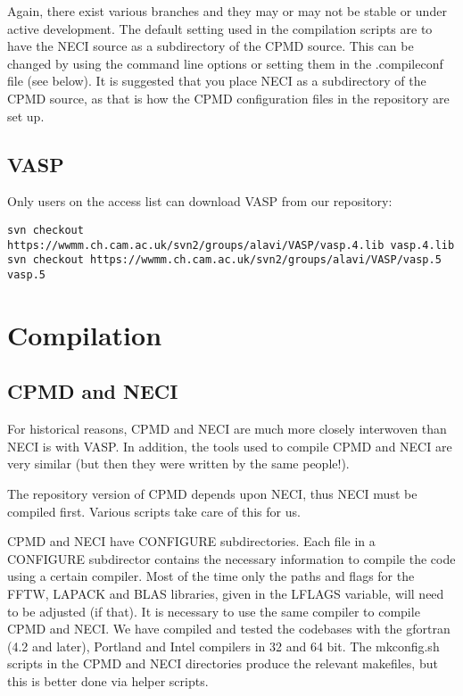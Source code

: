 \documentclass[openany,a4paper,10pt]{manual}
\begin{document}
Again, there exist various branches and they may or may not be stable
or under active development.
The default setting used in the compilation scripts are to have the NECI source as
a subdirectory of the CPMD source.  This can be changed by using the
command line options or setting them in the .compileconf file (see below).
It is suggested that you place NECI as a subdirectory of the CPMD source,
as that is how the CPMD configuration files in the repository are set up.


\subsection{VASP}

Only users on the access list can download VASP from our repository:

\begin{Verbatim}[commandchars=@\[\]]
svn checkout https://wwmm.ch.cam.ac.uk/svn2/groups/alavi/VASP/vasp.4.lib vasp.4.lib
svn checkout https://wwmm.ch.cam.ac.uk/svn2/groups/alavi/VASP/vasp.5 vasp.5
\end{Verbatim}


\section{Compilation}


\subsection{CPMD and NECI}

For historical reasons, CPMD and NECI are much more closely interwoven
than NECI is with VASP.  In addition, the tools used to compile CPMD and
NECI are very similar (but then they were written by the same people!).

The repository version of CPMD depends upon NECI, thus NECI must be
compiled first.  Various scripts take care of this for us.

CPMD and NECI have CONFIGURE subdirectories.  Each file in a CONFIGURE
subdirector contains the necessary information to compile the code using
a certain compiler.  Most of the time only the paths and flags for the
FFTW, LAPACK and BLAS libraries, given in the LFLAGS variable, will need
to be adjusted (if that).  It is necessary to use the same compiler to
compile CPMD and NECI.  We have compiled and tested the codebases with the
gfortran (4.2 and later), Portland and Intel compilers in 32 and 64 bit.
The mkconfig.sh scripts in the CPMD and NECI directories produce the
relevant makefiles, but this is better done via helper scripts.
\end{document}
